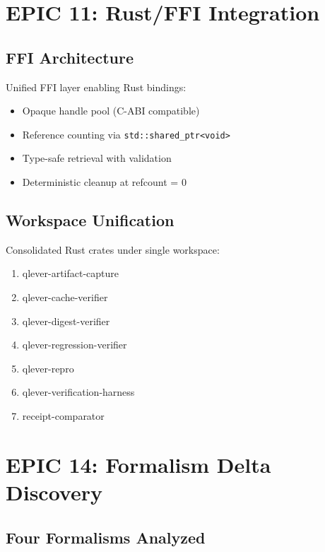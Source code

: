 \documentclass[12pt,oneside,a4paper]{book}
\theoremstyle{definition}
\begin{document}
\chapter{EPIC 11: Rust/FFI Integration}
\label{ch:epic11}


\section{FFI Architecture}
\label{sec:epic11-ffi}

Unified FFI layer enabling Rust bindings:
\begin{itemize}
  \item Opaque handle pool (C-ABI compatible)
  \item Reference counting via \texttt{std::shared\_ptr<void>}
  \item Type-safe retrieval with validation
  \item Deterministic cleanup at refcount = 0
\end{itemize}

\section{Workspace Unification}
\label{sec:epic11-workspace}

Consolidated Rust crates under single workspace:
\begin{enumerate}
  \item qlever-artifact-capture
  \item qlever-cache-verifier
  \item qlever-digest-verifier
  \item qlever-regression-verifier
  \item qlever-repro
  \item qlever-verification-harness
  \item receipt-comparator
\end{enumerate}

\chapter{EPIC 14: Formalism Delta Discovery}
\label{ch:epic14}


\section{Four Formalisms Analyzed}
\label{sec:epic14-formalisms}
\end{document}
